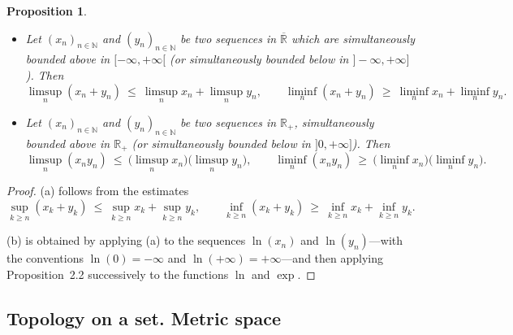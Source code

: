 \documentclass[11pt]{article}
\newtheorem{proposition}{Proposition}[section]
\theoremstyle{definition}
\begin{document}
\begin{proposition}
\begin{itemize}[leftmargin=1.5em]
\item[(a)] Let $(x_n)_{n\in\mathbb{N}}$ and $(y_n)_{n\in\mathbb{N}}$ be two sequences in $\overline{\mathbb{R}}$ which are simultaneously bounded above in $[-\infty,+\infty[$ (or simultaneously bounded below in $]-\infty,+\infty]$).
Then
\[
\limsup_{n}(x_n+y_n)\ \le\ \limsup_{n} x_n + \limsup_{n} y_n,
\qquad
\liminf_{n}(x_n+y_n)\ \ge\ \liminf_{n} x_n + \liminf_{n} y_n .
\]
\item[(b)] Let $(x_n)_{n\in\mathbb{N}}$ and $(y_n)_{n\in\mathbb{N}}$ be two sequences in $\mathbb{R}_+$, simultaneously bounded above in $\mathbb{R}_+$ (or simultaneously bounded below in $]0,+\infty]$).
Then
\[
\limsup_{n}(x_n y_n)\ \le\ \bigl(\limsup_{n} x_n\bigr)\bigl(\limsup_{n} y_n\bigr),
\qquad
\liminf_{n}(x_n y_n)\ \ge\ \bigl(\liminf_{n} x_n\bigr)\bigl(\liminf_{n} y_n\bigr).
\]
\end{itemize}
\end{proposition}

\begin{proof}
(a) follows from the estimates
\[
\sup_{k\ge n}(x_k+y_k)\ \le\ \sup_{k\ge n} x_k + \sup_{k\ge n} y_k,
\qquad
\inf_{k\ge n}(x_k+y_k)\ \ge\ \inf_{k\ge n} x_k + \inf_{k\ge n} y_k.
\]

(b) is obtained by applying (a) to the sequences $\ln(x_n)$ and $\ln(y_n)$—with the conventions $\ln(0)=-\infty$ and $\ln(+\infty)=+\infty$—and then applying Proposition~2.2 successively to the functions $\ln$ and $\exp$.
\end{proof}

\subsection{Topology on a set. Metric space}\label{sec:2.3}
\end{document}
